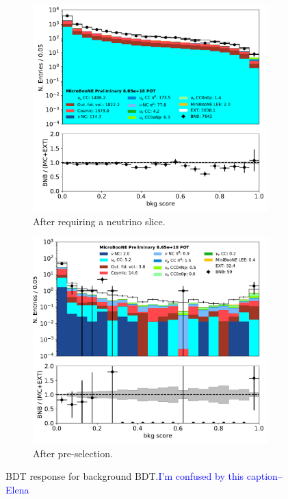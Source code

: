 \documentclass[a4paper]{article}
\begin{document}
\begin{figure}[H] 
\begin{center}
    \begin{subfigure}[b]{0.45\textwidth}
    \centering
    \includegraphics[width=1.00\textwidth]{1e0p/bkg_score_01162020_RUN3_nslice.pdf}
    \caption{\label{fig:1e0p:bdt:bkgscore:slice} After requiring a neutrino slice.}
    \end{subfigure}
    \begin{subfigure}[b]{0.45\textwidth}
    \centering
    \includegraphics[width=1.00\textwidth]{1e0p/bkg_score_01162020_RUN3_presel.pdf}
    \caption{\label{fig:1e0p:bdt:bkgscore:presel} After pre-selection.}
    \end{subfigure}
\caption{\label{fig:1e0p:bdt:bkgscore} BDT response for background BDT.\textcolor{blue}{I'm confused by this caption--Elena}}
\end{center}
\end{figure}
\end{document}
